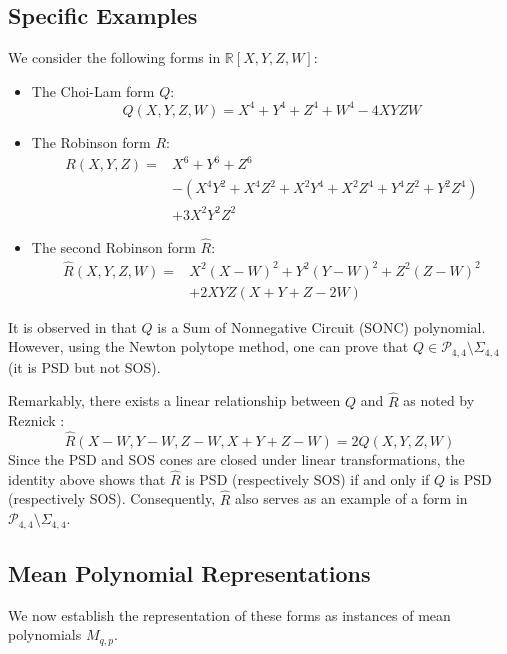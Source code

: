\documentclass{article}
\begin{document}
\subsection{Specific Examples}
We consider the following forms in $\mathbb{R}[X,Y,Z,W]$:
\begin{itemize}
    \item The Choi-Lam form $Q$:
    \[
        Q(X,Y,Z,W) = X^4 + Y^4 + Z^4 + W^4 - 4XYZW
    \]
    \item The Robinson form $R$:
    \[
        \begin{aligned}
            R(X,Y,Z) ={}& X^6 + Y^6 + Z^6 \\
            &- (X^4 Y^2 + X^4 Z^2 + X^2 Y^4 + X^2 Z^4 + Y^4 Z^2 + Y^2 Z^4) \\
            &+ 3X^2 Y^2 Z^2
        \end{aligned}
    \]
    \item The second Robinson form $\hat{R}$:
    \[
        \begin{aligned}
            \hat{R}(X,Y,Z,W) ={}& X^2(X-W)^2 + Y^2(Y-W)^2 + Z^2(Z-W)^2 \\
            &+ 2XYZ(X+Y+Z-2W)
        \end{aligned}
    \]
\end{itemize}

It is observed in \cite{MSc01} that $Q$ is a Sum of Nonnegative Circuit (SONC) polynomial. However, using the 
Newton polytope method, one can prove that $Q \in \mathcal{P}_{4,4} \setminus \Sigma_{4,4}$ (it is PSD but not SOS).

Remarkably, there exists a linear relationship between $Q$ and $\hat{R}$ as noted by Reznick \cite{Rez07}:
\begin{equation}\label{eq:R_hat_Q_relation}
    \hat{R}(X-W, Y-W, Z-W, X+Y+Z-W) = 2Q(X,Y,Z,W)
\end{equation}
Since the PSD and SOS cones are closed under linear transformations, the identity above shows that $\hat{R}$ is PSD 
(respectively SOS) if and only if $Q$ is PSD (respectively SOS). Consequently, $\hat{R}$ also serves as an example of a 
form in $\mathcal{P}_{4,4} \setminus \Sigma_{4,4}$.

\subsection{Mean Polynomial Representations}

We now establish the representation of these forms as instances of mean polynomials $M_{q,p}$.
\end{document}
